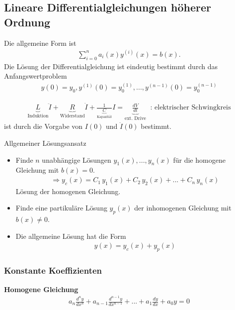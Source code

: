 \subsection{Lineare Differentialgleichungen höherer Ordnung}
Die allgemeine Form ist
\begin{align}
 \sum \limits_{i=0}^{n} a_i(x)y^{(i)}(x) = b(x).
\end{align}
Die Lösung der Differentialgleichung ist eindeutig bestimmt durch das Anfangswertproblem
\begin{align}
 y(0) = y_0, y^{(1)}(0) = y_0^{(1)}, ..., y^{(n-1)}(0) = y_0^{(n-1)}
\end{align}

\begin{Beispiel}
\begin{align}
 \underbrace{L}_{\text{Induktion}} \ddot{I} + \underbrace{R}_{\text{Widerstand}}\dot{I} + \frac{1}{\underbrace{C}_{\text{Kapazität}}}I = \underbrace{\frac{dV}{dt}}_{\text{ext. Drive}} \; \text{ : elektrischer Schwingkreis}
\end{align}
ist durch die Vorgabe von $I(0)$ und $\dot{I}(0)$ bestimmt.
\end{Beispiel}

Allgemeiner Lösungsansatz
\begin{itemize}
  \item Finde $n$ unabhängige Lösungen $y_1(x), ..., y_n(x)$ für die homogene
  Gleichung mit $b(x) = 0$.
  \begin{align*}
  \Rightarrow y_c(x) = C_1\,y_1(x)+ C_2\,y_2(x) + ... + C_n\,y_n(x)
  \end{align*}
  Lösung der homogenen Gleichung.
  \item Finde eine partikuläre Lösung $y_p(x)$ der inhomogenen Gleichung mit
  $b(x) \neq 0$.
  \item Die allgemeine Lösung hat die Form
  \begin{align}
  y(x) = y_c(x) + y_p(x)
  \end{align}
\end{itemize}

\subsubsection{Konstante Koeffizienten}
{\bf Homogene Gleichung}
\begin{align}
 a_n \frac{d^ny}{dx^n} + a_{n-1} \frac{d^{n-1}y}{dx^{n-1}} + ... + a_1\frac{dy}{dx} + a_0y = 0
\end{align}

